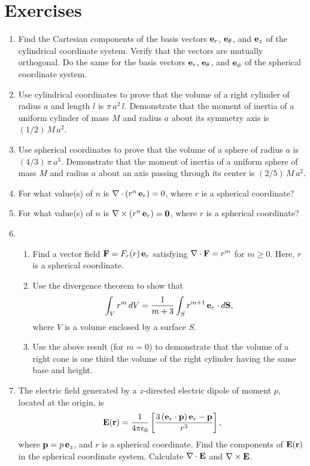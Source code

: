 \section{Exercises}
{\small 
\renewcommand{\theenumi}{C.\arabic{enumi}}
\begin{enumerate}
\item Find the Cartesian components of the basis vectors ${\bf e}_r$,
${\bf e}_\theta$, and ${\bf e}_z$ of the cylindrical coordinate
system. Verify that the vectors are mutually orthogonal. Do the
same for the basis vectors ${\bf e}_r$, ${\bf e}_\theta$, and ${\bf e}_\phi$ of the spherical  coordinate system.

\item Use cylindrical coordinates to prove that the volume of a right cylinder of radius $a$ and
length $l$ is $\pi\,a^2\,l$. Demonstrate that the moment of inertia of a uniform cylinder of mass $M$ and radius $a$ about
its symmetry axis is $(1/2)\,M\,a^2$.

\item Use spherical coordinates to prove that the volume of a sphere of radius $a$ is $(4/3)\,\pi\,a^3$. Demonstrate that the moment of inertia of a uniform sphere of mass $M$ and radius $a$ about
an axis passing through its center  is $(2/5)\,M\,a^2$.

\item For what value(s) of $n$ is $\nabla\cdot(r^n\,{\bf e}_r)=0$, where $r$ is a
spherical coordinate?

\item For what value(s) of $n$ is $\nabla\times(r^n\,{\bf e}_r)={\bf 0}$, where $r$ is a
spherical coordinate?

\item \begin{enumerate}
\item Find a vector field ${\bf F} = F_r(r)\,{\bf e}_r$ satisfying $\nabla\cdot {\bf F} = r^m$ for $m\geq 0$. Here,
$r$ is a spherical coordinate.
\item Use the divergence theorem to show that
$$
\int_V r^m\,dV = \frac{1}{m+3}\int_S r^{m+1}\,{\bf e}_r\cdot d{\bf S},
$$
where $V$ is a volume enclosed by a surface $S$.
\item Use the above result (for $m=0$) to demonstrate that the volume of a right cone is
one third the volume of the right cylinder having the same base and height. 
\end{enumerate}

\item The electric field generated by a $z$-directed electric dipole of moment $p$, located
at the origin, is
$$
{\bf E}({\bf r})= \frac{1}{4\pi\epsilon_0} \left[\frac{3\,({\bf e}_r\cdot {\bf p})\,{\bf e}_r-{\bf p}}{r^3}\right],
$$
where ${\bf p} = p\,{\bf e}_z$, and $r$ is a spherical coordinate. Find the components of ${\bf E}({\bf r})$ in
the spherical coordinate system. Calculate $\nabla\cdot{\bf E}$ and $\nabla\times {\bf E}$. 


\end{enumerate}}
